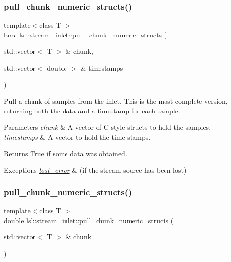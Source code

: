\subsubsection{\texorpdfstring{pull\+\_\+chunk\+\_\+numeric\+\_\+structs()}{pull\_chunk\_numeric\_structs()}\hspace{0.1cm}{\footnotesize\ttfamily [1/3]}}
{\footnotesize\ttfamily template$<$class T $>$ \\
bool lsl\+::stream\+\_\+inlet\+::pull\+\_\+chunk\+\_\+numeric\+\_\+structs (\begin{DoxyParamCaption}\item[{std\+::vector$<$ T $>$ \&}]{chunk,  }\item[{std\+::vector$<$ double $>$ \&}]{timestamps }\end{DoxyParamCaption})\hspace{0.3cm}{\ttfamily [inline]}}

Pull a chunk of samples from the inlet. This is the most complete version, returning both the data and a timestamp for each sample. 
\begin{DoxyParams}{Parameters}
{\em chunk} & A vector of C-\/style structs to hold the samples. \\
\hline
{\em timestamps} & A vector to hold the time stamps. \\
\hline
\end{DoxyParams}
\begin{DoxyReturn}{Returns}
True if some data was obtained. 
\end{DoxyReturn}

\begin{DoxyExceptions}{Exceptions}
{\em \hyperlink{classlsl_1_1lost__error}{lost\+\_\+error}} & (if the stream source has been lost) \\
\hline
\end{DoxyExceptions}
\mbox{\label{classlsl_1_1stream__inlet_ab14a0120e49dcd33f6df0716e6606810}} 
\subsubsection{\texorpdfstring{pull\+\_\+chunk\+\_\+numeric\+\_\+structs()}{pull\_chunk\_numeric\_structs()}\hspace{0.1cm}{\footnotesize\ttfamily [2/3]}}
{\footnotesize\ttfamily template$<$class T $>$ \\
double lsl\+::stream\+\_\+inlet\+::pull\+\_\+chunk\+\_\+numeric\+\_\+structs (\begin{DoxyParamCaption}\item[{std\+::vector$<$ T $>$ \&}]{chunk }\end{DoxyParamCaption})\hspace{0.3cm}{\ttfamily [inline]}}

